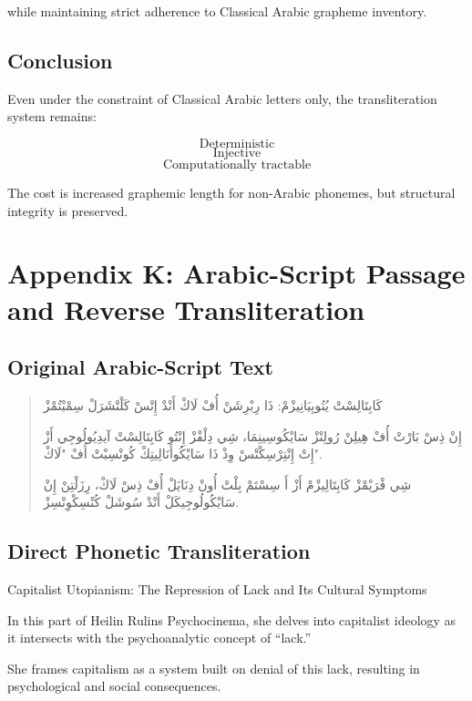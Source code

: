\documentclass[12pt]{article}
\begin{document}
while maintaining strict adherence to Classical Arabic grapheme inventory.

\subsection{Conclusion}

Even under the constraint of Classical Arabic letters only, the transliteration system remains:

\[
\text{Deterministic}
\]
\[
\text{Injective}
\]
\[
\text{Computationally tractable}
\]

The cost is increased graphemic length for non-Arabic phonemes, but structural integrity is preserved.

\section{Appendix K: Arabic-Script Passage and Reverse Transliteration}

\subsection{Original Arabic-Script Text}

\begin{quote}
كَابِتَالِسْتْ يُتُوبِيَانِيزْمْ: ذَا رِبْرِشَنْ أُفْ لَاكْ أَنْدْ إِتْسْ كَلْتْشَرَلْ سِمْبْتُمْزْ

إِنْ ذِسْ بَارْتْ أُفْ هِيلِنْ رُولِنْزْ سَايْكُوسِينِمَا، شِي دِلْفْزْ إِنْتُو كَابِتَالِسْتْ آيدِيُولُوجِي أَزْ إِتْ إِنْتِرْسِكْتْسْ وِذْ ذَا سَايْكُوأَنَالِيتِكْ كُونْسِبْتْ أُفْ "لَاكْ".

شِي فْرَيْمْزْ كَابِتَالِيزْمْ أَزْ أَ سِسْتَمْ بِلْتْ أُونْ دِنَايَلْ أُفْ ذِسْ لَاكْ، رِزَلْتِنْ إِنْ سَايْكُولُوجِيكَلْ أَنْدْ سُوشَلْ كُنْسِكْوِنْسِزْ.
\end{quote}

\subsection{Direct Phonetic Transliteration}

Capitalist Utopianism: The Repression of Lack and Its Cultural Symptoms

In this part of Heilin Rulins Psychocinema, she delves into capitalist ideology as it intersects with the psychoanalytic concept of “lack.”

She frames capitalism as a system built on denial of this lack, resulting in psychological and social consequences.
\end{document}
